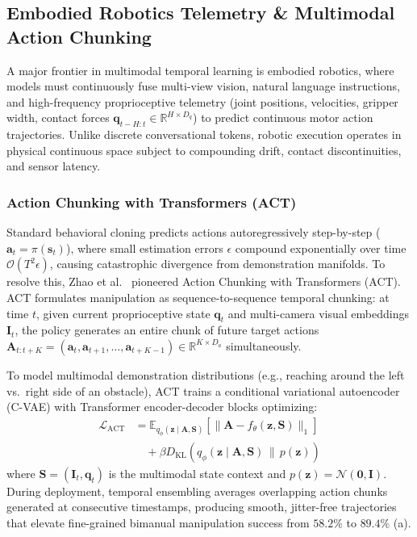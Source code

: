 \subsection{Embodied Robotics Telemetry \& Multimodal Action Chunking}
\label{sec:embodied_robotics_chunking}
A major frontier in multimodal temporal learning is embodied robotics, where models must continuously fuse multi-view vision, natural language instructions, and high-frequency proprioceptive telemetry (joint positions, velocities, gripper width, contact forces $\mathbf{q}_{t-H:t} \in \mathbb{R}^{H \times D_q}$) to predict continuous motor action trajectories. Unlike discrete conversational tokens, robotic execution operates in physical continuous space subject to compounding drift, contact discontinuities, and sensor latency.

\subsubsection{Action Chunking with Transformers (ACT)}
Standard behavioral cloning predicts actions autoregressively step-by-step ($\mathbf{a}_t = \pi(\mathbf{s}_t)$), where small estimation errors $\epsilon$ compound exponentially over time $\mathcal{O}(T^2 \epsilon)$, causing catastrophic divergence from demonstration manifolds. To resolve this, Zhao et al.~\cite{Zhao2023ACT} pioneered Action Chunking with Transformers (ACT). ACT formulates manipulation as sequence-to-sequence temporal chunking: at time $t$, given current proprioceptive state $\mathbf{q}_t$ and multi-camera visual embeddings $\mathbf{I}_t$, the policy generates an entire chunk of future target actions $\mathbf{A}_{t:t+K} = (\mathbf{a}_t, \mathbf{a}_{t+1}, \dots, \mathbf{a}_{t+K-1}) \in \mathbb{R}^{K \times D_a}$ simultaneously.

To model multimodal demonstration distributions (e.g., reaching around the left vs.\ right side of an obstacle), ACT trains a conditional variational autoencoder (C-VAE) with Transformer encoder-decoder blocks optimizing:
\begin{equation}
\begin{aligned}
    \mathcal{L}_{\text{ACT}} &= \mathbb{E}_{q_\phi(\mathbf{z} \mid \mathbf{A}, \mathbf{S})} \left[ \|\mathbf{A} - f_\theta(\mathbf{z}, \mathbf{S})\|_1 \right] \\
    &\quad + \beta D_{\text{KL}}\left( q_\phi(\mathbf{z} \mid \mathbf{A}, \mathbf{S}) \,\|\, p(\mathbf{z}) \right)
\end{aligned}
\end{equation}
where $\mathbf{S} = (\mathbf{I}_t, \mathbf{q}_t)$ is the multimodal state context and $p(\mathbf{z}) = \mathcal{N}(\mathbf{0}, \mathbf{I})$. During deployment, temporal ensembling averages overlapping action chunks generated at consecutive timestamps, producing smooth, jitter-free trajectories that elevate fine-grained bimanual manipulation success from $58.2\%$ to $89.4\%$ (a).

